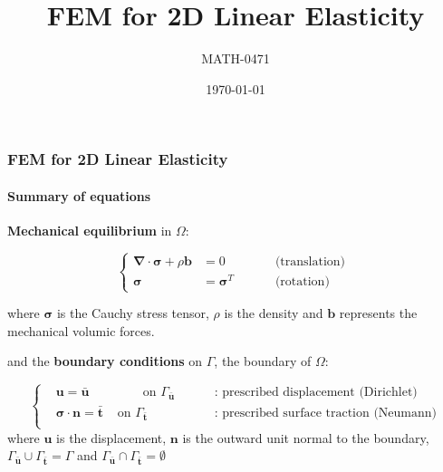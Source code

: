\documentclass[10pt,xcolor=pdftex,dvipsnames,table]{beamer}
\title{FEM for 2D Linear Elasticity}
\author{ MATH-0471 }
\date{\today}
\begin{document}
\frame{\titlepage}



\begin{frame}
	\frametitle{ FEM for 2D Linear Elasticity }
	\framesubtitle{ Summary of equations }
	
	\textbf{Mechanical equilibrium} in $\Omega$:
	
	\begin{equation*}
		\left\{
		\begin{aligned}
		 \boldsymbol{\nabla}\cdot\boldsymbol{\sigma} + \rho\boldsymbol{b} &= 0
		\qquad &&\text{ (translation) } \\
		 \boldsymbol{\sigma} &= \boldsymbol{\sigma}^T &&\text{ (rotation) }
		\end{aligned}
	\right.
	\end{equation*}
	
	where $\boldsymbol{\sigma}$ is the Cauchy stress tensor, $\rho$ is the density and $\boldsymbol{b}$ represents the mechanical volumic forces.	
	
	
	
and the \textbf{boundary conditions} on $\Gamma$, the boundary of $\Omega$:

\begin{equation*}
	\left\{
	\begin{aligned}
		&  \boldsymbol{u} = \bar{\boldsymbol{u}}     & \qquad \text { on } \Gamma_{\bar{\boldsymbol{u}}} & \qquad \text{ : prescribed displacement (Dirichlet)} \\
		&  \boldsymbol{\sigma}\cdot\boldsymbol{n}  = \bar{\boldsymbol{t}}     & \text { on } \Gamma_{\bar{\boldsymbol{t}}} & \qquad \text{ : prescribed surface traction (Neumann)} \\
	\end{aligned}
	\right.    
\end{equation*}	
where $\boldsymbol{u}$ is the displacement, $\boldsymbol{n}$ is the outward unit normal to the boundary, $\Gamma_{\bar{\boldsymbol{u}}} \cup \Gamma_{\bar{\boldsymbol{t}}} = \Gamma$ and $\Gamma_{\bar{\boldsymbol{u}}} \cap \Gamma_{\bar{\boldsymbol{t}}} = \emptyset$


\end{frame}
\end{document}
